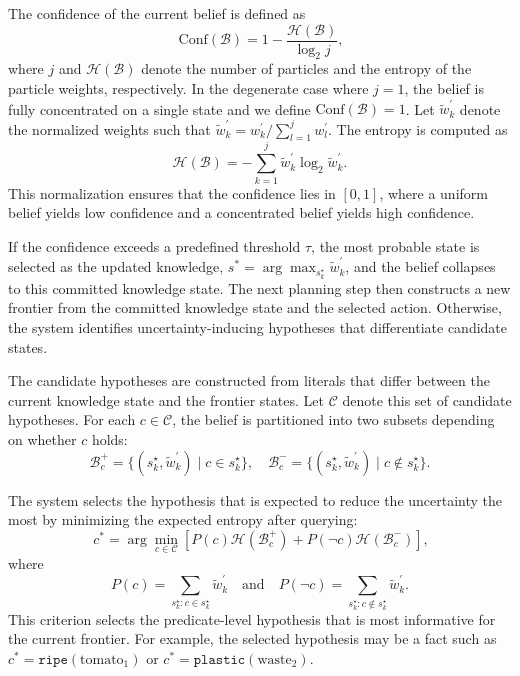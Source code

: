 The confidence of the current belief is defined as
\begin{equation}~\label{eq:compute_confidence}
\mathrm{Conf}(\mathcal{B}) = 1 - \frac{\mathcal{H}(\mathcal{B})}{\log_2 j},
\end{equation}
where $j$ and $\mathcal{H}(\mathcal{B})$ denote the number of particles and the entropy of the particle weights, respectively. In the degenerate case where $j=1$, the belief is fully concentrated on a single state and we define $\mathrm{Conf}(\mathcal{B}) = 1$. Let $\tilde{w}_k^\prime$ denote the normalized weights such that $\tilde{w}_k^\prime = {w_k^\prime}/{\sum_{l=1}^{j} w_l^\prime}$. The entropy is computed as
\[
\mathcal{H}(\mathcal{B}) = - \sum_{k=1}^{j} \tilde{w}_k^\prime \log_2 \tilde{w}_k^\prime.
\]
This normalization ensures that the confidence lies in $[0,1]$, where a uniform belief yields low confidence and a concentrated belief yields high confidence.


If the confidence exceeds a predefined threshold $\tau$, the most probable state is selected as the updated knowledge, $s^{*} = \arg\max_{s_k^{\star}} \tilde{w}_k^\prime$, and the belief collapses to this committed knowledge state. The next planning step then constructs a new frontier from the committed knowledge state and the selected action. Otherwise, the system identifies uncertainty-inducing hypotheses that differentiate candidate states.

The candidate hypotheses are constructed from literals that differ between the current knowledge state and the frontier states. Let $\mathcal{C}$ denote this set of candidate hypotheses. For each $c \in \mathcal{C}$, the belief is partitioned into two subsets depending on whether $c$ holds:
$$
\mathcal{B}^{+}_{c} = \{(s_k^{\star}, \tilde{w}_k^\prime) \mid c \in s_k^{\star}\},
\quad
\mathcal{B}^{-}_{c} = \{(s_k^{\star}, \tilde{w}_k^\prime) \mid c \notin s_k^{\star}\}.
$$


The system selects the hypothesis that is expected to reduce the uncertainty the most by minimizing the expected entropy after querying:
\begin{equation}~\label{eq:select_hypo}
c^{*} = \arg\min_{c \in \mathcal{C}}
\left[
P(c)\mathcal{H}(\mathcal{B}^{+}_{c}) +
P(\neg c)\mathcal{H}(\mathcal{B}^{-}_{c})
\right],
\end{equation}
where 
\[
P(c)=\sum_{s_k^{\star}: c \in s_k^{\star}} \tilde{w}_k^\prime \quad \text{and} \quad P(\neg c)=\sum_{s_k^{\star}: c \notin s_k^{\star}} \tilde{w}_k^\prime.
\]
This criterion selects the predicate-level hypothesis that is most informative for the current frontier. For example, the selected hypothesis may be a fact such as $c^{*}=\texttt{ripe}(\text{tomato}_1)$ or $c^{*}=\texttt{plastic}(\text{waste}_2)$.

